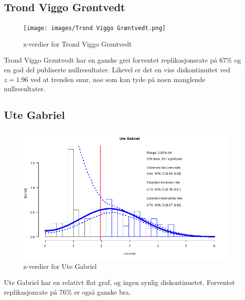 \documentclass[doc,norsk]{apa7}
\begin{document}
\subsection{Trond Viggo Grøntvedt}
\begin{figure}[h!]
    \centering
    \texttt{[image: images/Trond Viggo Grøntvedt.png]}
    \caption{z-verdier for Trond Viggo Grøntvedt}
\end{figure}
Trond Viggo Grøntvedt har en ganske grei forventet replikasjonsrate på 67\% og en god del publiserte nullresultater. Likevel er det en viss diskontinuitet ved $z=1.96$ ved at trenden snur, noe som kan tyde på noen manglende nullresultater.

\subsection{Ute Gabriel}
\begin{figure}[h!]
    \centering
    \includegraphics[width=\textwidth]{images/Ute Gabriel.png}
    \caption{z-verdier for Ute Gabriel}
\end{figure}
Ute Gabriel har en relativt flat graf, og ingen synlig diskontinuetet. Forventet replikasjonrate på 76\% er også ganske bra.
\end{document}
